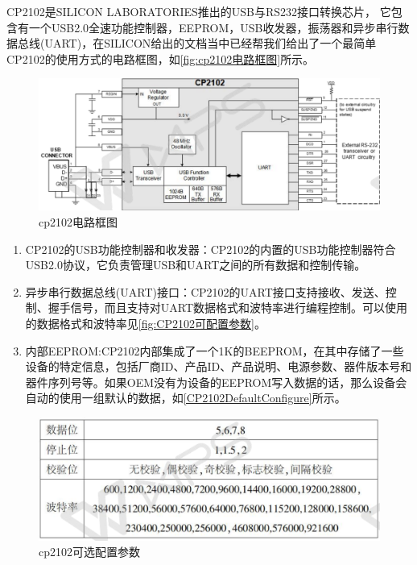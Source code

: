 	CP2102是SILICON LABORATORIES推出的USB与RS232接口转换芯片，
	它包含有一个USB2.0全速功能控制器，EEPROM，USB收发器，振荡器和异步串行数据总线(UART)，在SILICON给出的文档当中已经帮我们给出了一个最简单 CP2102的使用方式的电路框图，如\autoref{fig:cp2102电路框图}所示。
\begin{figure}[!h]
\centering
\includegraphics[width=1.0\textwidth]{./graphics/cp2102-circuit-diagram.pdf}
\caption{cp2102电路框图}\label{fig:cp2102电路框图}
\end{figure}

\begin{enumerate}
\item CP2102的USB功能控制器和收发器：CP2102的内置的USB功能控制器符合USB2.0协议，它负责管理USB和UART之间的所有数据和控制传输。
\item 异步串行数据总线(UART)接口：CP2102的UART接口支持接收、发送、控制、握手信号，而且支持对UART数据格式和波特率进行编程控制。可以使用的数据格式和波特率见\autoref{fig:CP2102可配置参数}。
\item 内部EEPROM:CP2102内部集成了一个1K的BEEPROM，在其中存储了一些设备的特定信息，包括厂商ID、产品ID、产品说明、电源参数、器件版本号和器件序列号等\cite{CP2102}。如果OEM没有为设备的EEPROM写入数据的话，那么设备会自动的使用一组默认的数据，如\autoref{CP2102DefaultConfigure}所示。
\end{enumerate}

\begin{figure}[!h]
\centering
\includegraphics[width=1.0\textwidth]{./graphics/CP2102ChioceConf.pdf}
\caption{cp2102可选配置参数}\label{fig:CP2102可配置参数}
\end{figure}


